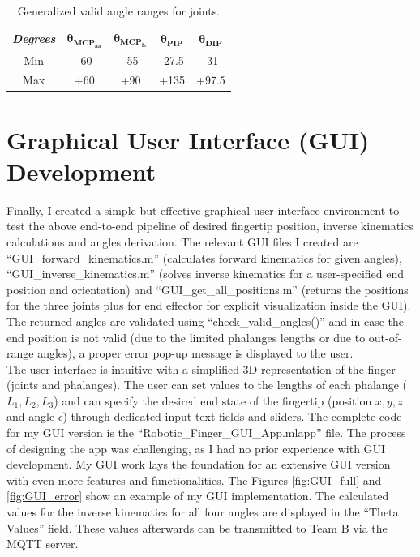 \documentclass[a4paper,12pt]{article}
\begin{document}
\begin{table}[htbp]
\centering
\caption{Generalized valid angle ranges for joints.}
\label{tab:valid_angles}
\vspace{1pt}
\begin{tabular}{|c|c|c|c|c|}
\hline
\textit{\textbf{Degrees}} & $\boldsymbol{\theta_{MCP_{aa}}}$ & $\boldsymbol{\theta_{MCP_{fe}}}$ & $\boldsymbol{\theta_{PIP}}$ & $\boldsymbol{\theta_{DIP}}$ \\ \hhline{|=|=|=|=|=|}
Min & -60 & -55 & -27.5 & -31\\ \hline
Max & +60 & +90 & +135 & +97.5\\ \hline
\end{tabular}
\end{table}


\section{Graphical User Interface (GUI) Development}
Finally, I created a simple but effective graphical user interface environment to test the above end-to-end pipeline of desired fingertip position, inverse kinematics calculations and angles derivation. The relevant GUI files I created are ``GUI\_forward\_kinematics.m'' (calculates forward kinematics for given angles), ``GUI\_inverse\_kinematics.m'' (solves inverse kinematics for a user-specified end position and orientation) and ``GUI\_get\_all\_positions.m'' (returns the positions for the three joints plus for end effector for explicit visualization inside the GUI). The returned angles are validated using ``check\_valid\_angles()'' and in case the end position is not valid (due to the limited phalanges lengths or due to out-of-range angles), a proper error pop-up message is displayed to the user.\\

The user interface is intuitive with a simplified 3D representation of the finger (joints and phalanges). The user can set values to the lengths of each phalange ($L_{1}, L_{2}, L_{3}$) and can specify the desired end state of the fingertip (position $x, y, z$ and angle $\epsilon$) through dedicated input text fields and sliders. The complete code for my GUI version is the ``Robotic\_Finger\_GUI\_App.mlapp'' file. The process of designing the app was challenging, as I had no prior experience with GUI development. My GUI work lays the foundation for an extensive GUI version with even more features and functionalities. The Figures \ref{fig:GUI_full} and \ref{fig:GUI_error} show an example of my GUI implementation. The calculated values for the inverse kinematics for all four angles are displayed in the ``Theta Values'' field. These values afterwards can be transmitted to Team B via the MQTT server.
\end{document}
